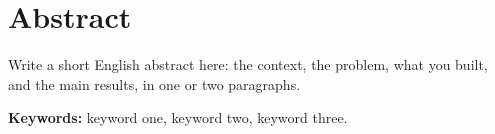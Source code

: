 \chapter*{Abstract}
\thispagestyle{plain}

Write a short English abstract here: the context, the problem, what you
built, and the main results, in one or two paragraphs.

\vspace{1em}
\noindent\textbf{Keywords:} keyword one, keyword two, keyword three.

\newpage
